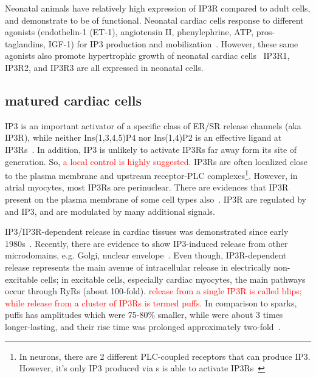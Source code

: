 Neonatal animals have relatively high expression of IP3R compared to
adult cells, and demonstrate to be of functional. Neonatal cardiac
cells response to different agonists (endothelin-1 (ET-1), angiotensin
II, phenylephrine, ATP, pros-taglandins, IGF-1) for IP3 production and
 mobilization~\citep{jaconi2000ip3,shubeita1990et1}.
However, these same agonists also promote hypertrophic growth of
neonatal cardiac cells~\citep{shubeita1990et1,iwaki1990aba} IP3R1,
IP3R2, and IP3R3 are all expressed in neonatal
cells\citep{kockskamper2008ip3}.


\subsection{matured cardiac cells}
\label{sec:matur-card-cells}


IP3 is an important activator of a specific class of ER/SR 
release channels (aka IP3R), while neither Ins(1,3,4,5)P4 nor
Ins(1,4)P2 is an effective ligand at IP3Rs~\citep{wilcox1998ndp}. In
addition, IP3 is unlikely to activate IP3Rs far away form its site of
generation. So, \textcolor{red}{a local control is highly suggested}.
IP3Rs are often localized close to the plasma membrane and upstream
receptor-PLC
complexes\footnote{In neurons, there are 2 different PLC-coupled
  receptors that can produce IP3. However, it's only IP3 produced via
  s is able to activate IP3Rs~\citep{delmas2002smd}}.  However,
in atrial myocytes, most IP3Rs are perinuclear. There are evidences
that IP3R present on the plasma membrane of some cell types
also~\citep{vazquez2002ip3r}. IP3R are regulated by  and IP3,
and are modulated by many additional signals.

IP3/IP3R-dependent  release in cardiac tissues was
demonstrated since early 1980s~\citep{hirata1984rci,nosek1986ite}.
Recently, there are evidence to show IP3-induced  release
from other microdomains, e.g. Golgi, nuclear
envelope~\citep{rizzuto2006mic}.  Even though, IP3R-dependent
 release represents the main avenue of intracellular
 release in electrically non-excitable cells; in excitable
cells, especially cardiac myocytes, the main pathways occur through
RyRs (about 100-fold).
\textcolor{red}{  release from a single IP3R is called
   blips; while  release from a cluster of IP3Rs
  is termed  puffs.}
In comparison to  sparks,  puffs has amplitudes
which were 75-80\% smaller, while were about 3 times longer-lasting,
and their rise time was prolonged approximately
two-fold~\citep{kockskamper2008ip3}.


